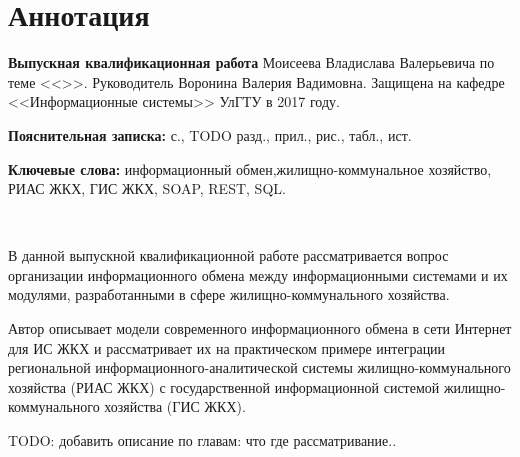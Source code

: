 
\section*{Аннотация}

\textbf{Выпускная квалификационная работа} Моисеева Владислава Валерьевича по теме <<\WorkName>>.
Руководитель Воронина Валерия Вадимовна.
Защищена на кафедре <<Информационные системы>> УлГТУ в 2017 году.

\textbf{Пояснительная записка:}  с.,  TODO разд.,  прил.,  рис.,  табл.,  ист.

\textbf{Ключевые слова:} информационный обмен,\linebreak жилищно-коммунальное хозяйство, РИАС ЖКХ, ГИС ЖКХ, SOAP, REST, SQL.

~

В данной выпускной квалификационной работе рассматривается вопрос организации информационного обмена между информационными системами и их модулями, разработанными в сфере жилищно-коммунального хозяйства.

Автор описывает модели современного информационного обмена в сети Интернет для ИС ЖКХ и рассматривает их на практическом примере интеграции региональной информационного-аналитической системы жилищно-коммунального хозяйства (РИАС ЖКХ) с государственной информационной системой жилищно-коммунального хозяйства (ГИС ЖКХ).

TODO: добавить описание по главам: что где рассматривание..

\clearpage
\newpage